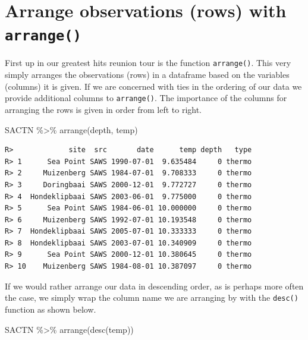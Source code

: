 \documentclass[
]{book}
\newenvironment{Shaded}{\begin{snugshade}}{\end{snugshade}}
\newcommand{\FunctionTok}[1]{\textcolor[rgb]{0.00,0.00,0.00}{#1}}
\newcommand{\NormalTok}[1]{#1}
\newcommand{\SpecialCharTok}[1]{\textcolor[rgb]{0.00,0.00,0.00}{#1}}
\begin{document}
\hypertarget{arrange-observations-rows-with-arrange}{%
\section{\texorpdfstring{Arrange observations (rows) with \texttt{arrange()}}{Arrange observations (rows) with arrange()}}\label{arrange-observations-rows-with-arrange}}

First up in our greatest hits reunion tour is the function \texttt{arrange()}. This very simply arranges the observations (rows) in a dataframe based on the variables (columns) it is given. If we are concerned with ties in the ordering of our data we provide additional columns to \texttt{arrange()}. The importance of the columns for arranging the rows is given in order from left to right.

\begin{Shaded}
\begin{Highlighting}[]
\NormalTok{SACTN }\SpecialCharTok{\%\textgreater{}\%} 
  \FunctionTok{arrange}\NormalTok{(depth, temp)}
\end{Highlighting}
\end{Shaded}

\begin{verbatim}
R>             site  src       date      temp depth   type
R> 1      Sea Point SAWS 1990-07-01  9.635484     0 thermo
R> 2     Muizenberg SAWS 1984-07-01  9.708333     0 thermo
R> 3     Doringbaai SAWS 2000-12-01  9.772727     0 thermo
R> 4  Hondeklipbaai SAWS 2003-06-01  9.775000     0 thermo
R> 5      Sea Point SAWS 1984-06-01 10.000000     0 thermo
R> 6     Muizenberg SAWS 1992-07-01 10.193548     0 thermo
R> 7  Hondeklipbaai SAWS 2005-07-01 10.333333     0 thermo
R> 8  Hondeklipbaai SAWS 2003-07-01 10.340909     0 thermo
R> 9      Sea Point SAWS 2000-12-01 10.380645     0 thermo
R> 10    Muizenberg SAWS 1984-08-01 10.387097     0 thermo
\end{verbatim}

If we would rather arrange our data in descending order, as is perhaps more often the case, we simply wrap the column name we are arranging by with the \texttt{desc()} function as shown below.

\begin{Shaded}
\begin{Highlighting}[]
\NormalTok{SACTN }\SpecialCharTok{\%\textgreater{}\%} 
  \FunctionTok{arrange}\NormalTok{(}\FunctionTok{desc}\NormalTok{(temp))}
\end{Highlighting}
\end{Shaded}
\end{document}
